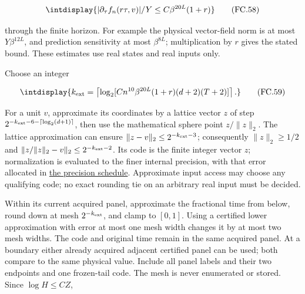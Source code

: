 \begingroup\renewcommand{\theHequation}{intdisplay.764}
\begin{equation}
\intdisplay{
|\partial_\tau f_n(r\tau,v)|/Y
\le C\beta^{20L}(1+r)
}
\tag{FC.58}
\label{int:eq-0363-fc-58}
\end{equation}
\endgroup


through the finite horizon. For example the physical vector-field norm is at most \(Y\beta^{12L}\), and prediction sensitivity at most \(\beta^{8L}\); multiplication by \(r\) gives the stated bound. These estimates use real states and real inputs only.



Choose an integer


\begingroup\renewcommand{\theHequation}{intdisplay.765}
\begin{equation}
\intdisplay{
k_{\rm ext}=\left\lceil
\log_2[C n^{10}\beta^{20L}(1+r)(d+2)(T+2)]
\right\rceil.
}
\tag{FC.59}
\label{int:eq-0364-fc-59}
\end{equation}
\endgroup


For a unit \(v\), approximate its coordinates by a lattice vector \(z\) of step \(2^{-k_{\rm ext}-6-\lceil\log_2(d+1)\rceil}\), then use the mathematical sphere point \(z/\|z\|_2\). The lattice approximation can ensure \(\|z-v\|_2\le2^{-k_{\rm ext}-3}\); consequently \(\|z\|_2\ge1/2\) and \(\|z/\|z\|_2-v\|_2\le2^{-k_{\rm ext}-2}\). Its code is the finite integer vector \(z\); normalization is evaluated to the finer internal precision, with that error allocated in \hyperref[int:decoder-precision-coupling]{the precision schedule}. Approximate input access may choose any qualifying code; no exact rounding tie on an arbitrary real input must be decided.



Within its current acquired panel, approximate the fractional time from below, round down at mesh \(2^{-k_{\rm ext}}\), and clamp to \([0,\allowbreak 1]\). Using a certified lower approximation with error at most one mesh width changes it by at most two mesh widths. The code and original time remain in the same acquired panel. At a boundary either already acquired adjacent certified panel can be used; both compare to the same physical value. Include all panel labels and their two endpoints and one frozen-tail code. The mesh is never enumerated or stored. Since \(\log H\le CZ\),


